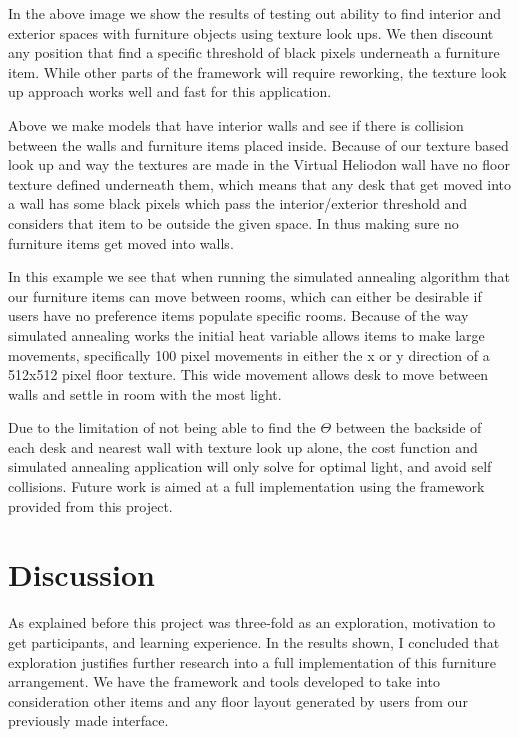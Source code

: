 \documentclass[twoside]{article}
\begin{document}
\begin{multicols}{2}
In the above image we show the results of testing out ability to find interior and exterior spaces with furniture objects using
texture look ups. We then discount any position that find a specific threshold of black pixels underneath a furniture item. While other
parts of the framework will require reworking, the texture look up approach works well and fast for this application.

Above we make models that have interior walls and see if there is collision between the walls and furniture items placed inside.
Because of our texture based look up and way the textures are made in the Virtual Heliodon wall have no floor texture defined
underneath them, which means that any desk that get moved into a wall has some black pixels which pass the interior/exterior
threshold and considers that item to be outside the given space. In thus making sure no furniture items get moved into walls.

In this example we see that when running the simulated annealing algorithm that our furniture items can move between rooms,
which can either be desirable if users have no preference items populate specific rooms. Because of the way simulated annealing 
works the initial heat variable allows items to make large movements, specifically 100 pixel movements in either the x or y 
direction of a 512x512 pixel floor texture. This wide movement allows desk to move between walls and settle in room with the
most light.

Due to the limitation of not being able to find the $\Theta$  between the backside of each desk and nearest wall with
texture look up alone, the cost function and simulated annealing application will only solve for optimal light, and avoid
self collisions. Future work is aimed at a full implementation using the framework provided from this project.

\section{Discussion}
As explained before this project was three-fold as an exploration, motivation to get participants, and learning experience. 
In the results shown, I concluded that exploration justifies further research into a full implementation
of this furniture arrangement. We have the framework and tools developed to take into consideration other 
items and any  floor layout generated by users from our previously made interface. 


\end{multicols}
\end{document}
